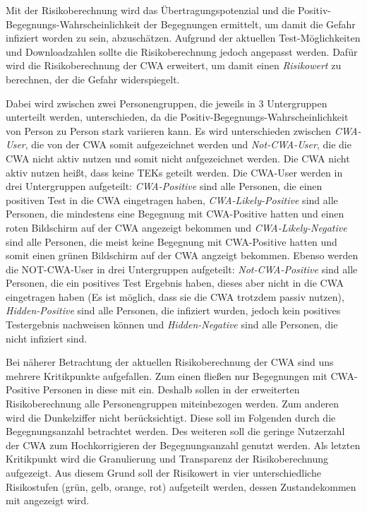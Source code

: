 \documentclass[conference,compsoc]{IEEEtran}
\begin{document}
Mit der Risikoberechnung wird das Übertragungspotenzial und die Positiv-Begegnungs-Wahrscheinlichkeit der Begegnungen ermittelt,
um damit die Gefahr infiziert worden zu sein, abzuschätzen.
Aufgrund der aktuellen Test-Möglichkeiten und Downloadzahlen sollte die Risikoberechnung jedoch angepasst werden.
Dafür wird die Risikoberechnung der CWA erweitert, 
um damit einen \textit{Risikowert} zu berechnen, der die Gefahr widerspiegelt.

Dabei wird zwischen zwei Personengruppen, die jeweils in 3 Untergruppen unterteilt werden, unterschieden, 
da die Positiv-Begegnungs-Wahrscheinlichkeit von Person zu Person stark variieren kann.
Es wird unterschieden zwischen \textit{CWA-User}, die von der CWA somit aufgezeichnet werden und \textit{Not-CWA-User}, 
die die CWA nicht aktiv nutzen und somit nicht aufgezeichnet werden. Die CWA nicht aktiv nutzen heißt, dass keine TEKs geteilt werden.
Die CWA-User werden in drei Untergruppen aufgeteilt: 
\textit{CWA-Positive} sind alle Personen, die einen positiven Test in die CWA eingetragen haben,
\textit{CWA-Likely-Positive} sind alle Personen, die mindestens eine Begegnung mit CWA-Positive hatten und einen roten Bildschirm auf der CWA angezeigt bekommen und
\textit{CWA-Likely-Negative} sind alle Personen, die meist keine Begegnung mit CWA-Positive hatten und somit einen grünen Bildschirm auf der CWA angzeigt bekommen.
Ebenso werden die NOT-CWA-User in drei Untergruppen aufgeteilt: 
\textit{Not-CWA-Positive} sind alle Personen, die ein positives Test Ergebnis haben, dieses aber nicht in die CWA eingetragen haben (Es ist möglich, dass sie die CWA trotzdem passiv nutzen), 
\textit{Hidden-Positive} sind alle Personen, die infiziert wurden, jedoch kein positives Testergebnis nachweisen können und 
\textit{Hidden-Negative} sind alle Personen, die nicht infiziert sind.

Bei näherer Betrachtung der aktuellen Risikoberechnung der CWA sind uns mehrere Kritikpunkte aufgefallen.
Zum einen fließen nur Begegnungen mit CWA-Positive Personen in diese mit ein.
Deshalb sollen in der erweiterten Risikoberechnung alle Personengruppen miteinbezogen werden.
Zum anderen wird die Dunkelziffer nicht berücksichtigt. Diese soll im Folgenden durch die Begegnungsanzahl betrachtet werden.
Des weiteren soll die geringe Nutzerzahl der CWA zum Hochkorrigieren der Begegnungsanzahl genutzt werden.
Als letzten Kritikpunkt wird die Granulierung und Transparenz der Risikoberechnung aufgezeigt. 
Aus diesem Grund soll der Risikowert in vier unterschiedliche Risikostufen (grün, gelb, orange, rot) aufgeteilt werden, dessen Zustandekommen mit angezeigt wird.
\end{document}
